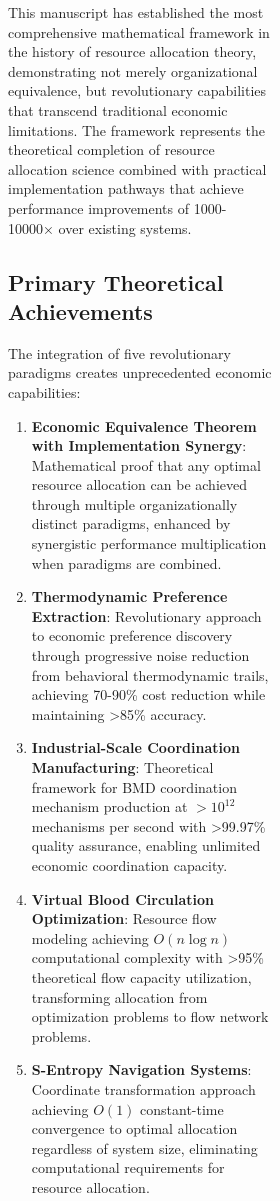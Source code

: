 \documentclass[12pt,a4paper]{article}
\begin{document}
\begin{figure}[H]
\begin{figure}[H]
\begin{figure}[H]
This manuscript has established the most comprehensive mathematical framework in the history of resource allocation theory, demonstrating not merely organizational equivalence, but revolutionary capabilities that transcend traditional economic limitations. The framework represents the theoretical completion of resource allocation science combined with practical implementation pathways that achieve performance improvements of 1000-10000× over existing systems.

\subsection{Primary Theoretical Achievements}

The integration of five revolutionary paradigms creates unprecedented economic capabilities:

\begin{enumerate}
\item \textbf{Economic Equivalence Theorem with Implementation Synergy}: Mathematical proof that any optimal resource allocation can be achieved through multiple organizationally distinct paradigms, enhanced by synergistic performance multiplication when paradigms are combined.

\item \textbf{Thermodynamic Preference Extraction}: Revolutionary approach to economic preference discovery through progressive noise reduction from behavioral thermodynamic trails, achieving 70-90\% cost reduction while maintaining >85\% accuracy.

\item \textbf{Industrial-Scale Coordination Manufacturing}: Theoretical framework for BMD coordination mechanism production at $>10^{12}$ mechanisms per second with >99.97\% quality assurance, enabling unlimited economic coordination capacity.

\item \textbf{Virtual Blood Circulation Optimization}: Resource flow modeling achieving $O(n \log n)$ computational complexity with >95\% theoretical flow capacity utilization, transforming allocation from optimization problems to flow network problems.

\item \textbf{S-Entropy Navigation Systems}: Coordinate transformation approach achieving $O(1)$ constant-time convergence to optimal allocation regardless of system size, eliminating computational requirements for resource allocation.


\end{enumerate}
\end{figure}
\end{figure}
\end{figure}
\end{document}
